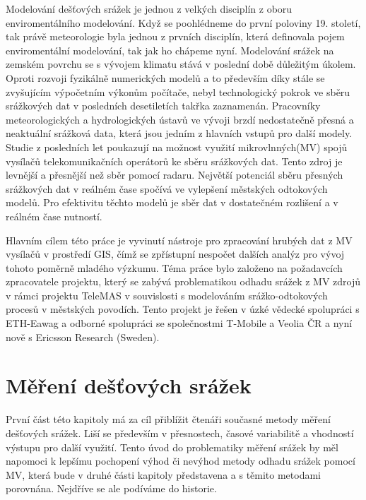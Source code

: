 \documentclass[a4paper,12pt]{article}
\begin{document}
Modelování dešťových srážek je jednou z velkých disciplín z oboru enviromentálního modelování. Když se poohlédneme do první poloviny 19. století, tak právě meteorologie byla jednou z prvních disciplín, která definovala pojem enviromentální modelování, tak jak ho chápeme nyní. Modelování srážek na zemském povrchu se s vývojem klimatu stává v poslední době důležitým úkolem. Oproti rozvoji fyzikálně numerických modelů a to především díky stále se zvyšujícím výpočetním výkonům počítače, nebyl technologický pokrok ve sběru srážkových dat v posledních desetiletích takřka zaznamenán. Pracovníky meteorologických a hydrologických ústavů ve vývoji brzdí nedostatečně přesná a neaktuální srážková data, která jsou jedním z hlavních vstupů pro další modely. Studie z posledních let poukazují na možnost využití mikrovlnných(MV) spojů vysílačů telekomunikačních operátorů ke sběru srážkových dat. Tento zdroj je levnější a přesnější než sběr pomocí radaru.\cite{radar_meterology} Největší potenciál sběru přesných srážkových dat v reálném čase spočívá ve vylepšení městských odtokových modelů. Pro efektivitu těchto modelů je sběr dat v dostatečném rozlišení a v reálném čase nutností.

Hlavním cílem této práce je vyvinutí nástroje pro zpracování hrubých dat z MV vysílačů v prostředí GIS, čímž se zpřístupní nespočet dalších analýz pro vývoj tohoto poměrně mladého výzkumu. Téma práce bylo založeno na požadavcích zpracovatele projektu, který se zabývá problematikou odhadu srážek z MV zdrojů v rámci projektu TeleMAS v souvislosti s modelováním srážko-odtokových procesů v městských povodích. Tento projekt je řešen v úzké vědecké spolupráci s ETH-Eawag a odborné spolupráci se společnostmi T-Mobile a Veolia ČR a nyní nově s Ericsson Research (Sweden).  

 





\section{Měření dešťových srážek}
První část této kapitoly má za cíl přiblížit čtenáři současné metody měření dešťových srážek. Liší se především v přesnostech, časové variabilitě a vhodností výstupu pro další využití. Tento úvod do problematiky měření srážek by měl napomoci k lepšímu pochopení výhod či nevýhod metody odhadu srážek pomocí MV, která bude v druhé části kapitoly představena a s těmito metodami porovnána. Nejdříve se ale podíváme do historie.
\end{document}
